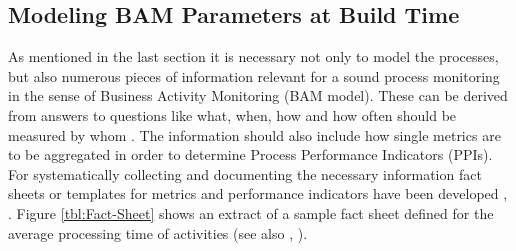 \subsection{Modeling BAM Parameters at Build Time}
As mentioned in the last section it is necessary not only to model the processes, but also numerous pieces of information relevant for a sound process monitoring in the sense of Business Activity Monitoring (BAM model). These can be derived from answers to questions like what, when, how and how often should be measured by whom \cite{book:ProzesseSchmelzer}. The information should also include how single metrics are to be aggregated in order to determine Process Performance Indicators (PPIs). For systematically collecting and documenting the necessary information fact sheets or templates for metrics and performance indicators have been developed \cite{book:KennzahlenIT}, \cite{book:ITControlling}. Figure \ref{tbl:Fact-Sheet}  shows an extract of a sample fact sheet defined for the average processing time of activities (see also \cite{article:SBPMCosting}, \cite{book:MonitoringSubjekt} ).


